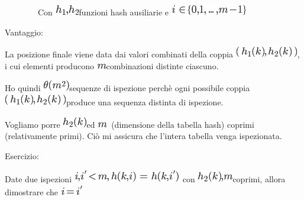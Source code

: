\documentclass{article}
\begin{document}
{~~~~~~~~Con }\includegraphics{images/image296.png}{funzioni hash
ausiliarie e }\includegraphics{images/image288.png}

{}

{Vantaggio}{:}

{La posizione finale viene data dai valori combinati della coppia
}\includegraphics{images/image297.png}{, i cui elementi producono
}\includegraphics{images/image235.png}{combinazioni distinte ciascuno.}

{Ho quindi }\includegraphics{images/image298.png}{sequenze di ispezione
perchè ogni possibile coppia
}\includegraphics{images/image297.png}{produce una sequenza distinta di
ispezione.}

{Vogliamo porre }\includegraphics{images/image299.png}{ed
}\includegraphics{images/image235.png}{~(dimensione della tabella hash)
coprimi (relativamente primi). Ciò mi assicura che l'intera tabella
venga ispezionata.}

{}

{}

{}

{}

{}

{}

{}

{Esercizio}{: }

{Date due ispezioni }\includegraphics{images/image300.png}{~con
}\includegraphics{images/image301.png}{coprimi, allora dimostrare che
}\includegraphics{images/image302.png}
\end{document}
